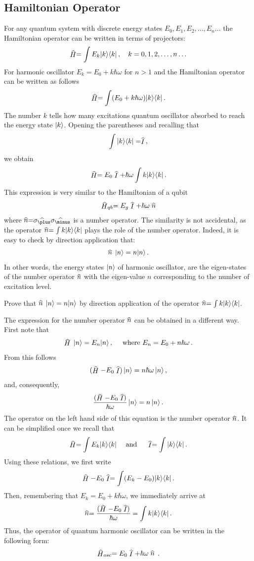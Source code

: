 \subsection{Hamiltonian Operator}
For any quantum system with discrete energy states $E_0, E_1, E_2,\ldots, E_n\ldots$ the Hamiltonian operator can be written in terms of projectors:
\[
\op{H}=\int E_k\ketbra{k}{k}\,,\quad k=0,1,2,\ldots,n\ldots 
\]
For harmonic oscillator $E_k=E_0+k\hbar\omega$ for $n>1$ and the Hamiltonian operator can be written as follows
\[
\op{H} = \int (E_0+k\hbar\omega)\ketbra{k}{k}\,.
\]
The number $k$ tells how many excitations quantum oscillator absorbed to reach the energy state $|{k}\rangle$.
Opening the parentheses and recalling that
\[
\int\ketbra{k}{k}=\op{I}\,,
\] 
we obtain 
\[
\op{H} = E_0\op{I}+\hbar\omega \int k\ketbra{k}{k}\,.
\]
This expression is very similar to the Hamiltonian of a qubit 
\[
\op{H}_{qb}=E_g\op{I}+\hbar\omega\op{n}
\]
where $\op{n}=\op{\sigma_\plus}\op{\sigma_\minus}$ is a number operator. The similarity is not accidental, as the operator $\op{n}=\int k\ketbra{k}{k}$ plays the role of the number operator. Indeed, it is easy to check by direction application that:
\[
\op{n}\,\ket{n}=n\ket{n}\,.
\]
In other words, the energy states $|{n}\rangle$ of harmonic oscillator, are the eigen-states of the number operator $\op{n}$ with the eigen-value $n$ corresponding to the number of excitation level.
\begin{exercise}
	Prove that $\op{n}\,\ket{n}=n\ket{n}$ by direction application of the operator $\op{n}=\int k\ketbra{k}{k}$.
\end{exercise}

The expression for the number operator $\op{n}$ can be obtained in a different way. First note that
\[
\op{H}\,\ket{n}=E_n\ket{n}\,,\quad\textrm{ where } E_n = E_0 + n\hbar\omega\,.
\]
From this follows
\[
(\op{H}-E_0\op{I})\,\ket{n}=n\hbar\omega\,\ket{n}\,,
\]
and, consequently, 
\[
\frac{(\op{H}-E_0\op{I})}{\hbar\omega}\,\ket{n}=n\,\ket{n}\,.
\]
The operator on the left hand side of this equation is the number operator $\op{n}$. It can be simplified once we recall that
\[
\op{H}=\int E_k\ketbra{k}{k}\quad\textrm{ and }\quad \op{I}=\int\ketbra{k}{k}\,.
\]
Using these relations, we first write
\[
\op{H}-E_0\op{I}=\int (E_k-E_0)\ketbra{k}{k}\,.
\]
Then, remembering that $E_k=E_0+k\hbar\omega$, we immediately arrive at
\[
\op{n}=\frac{(\op{H}-E_0\op{I})}{\hbar\omega}=\int k\ketbra{k}{k}\,.
\]
Thus, the operator of quantum harmonic oscillator can be written in the following form:
\[
\op{H}_{osc}=E_0\op{I}+\hbar\omega\op{n}\,.
\]

